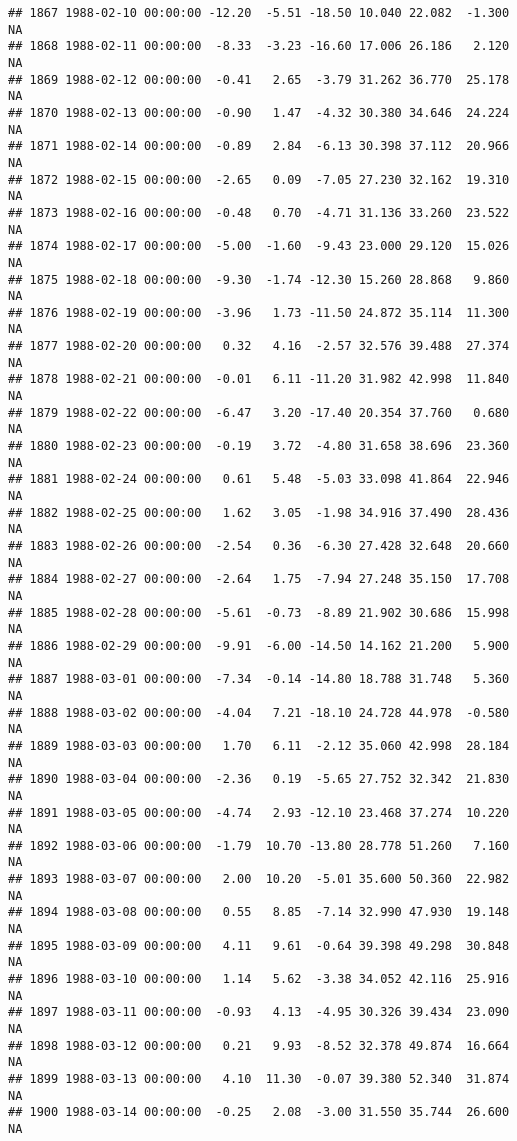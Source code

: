 \documentclass{article}\usepackage{graphicx, color}
\makeatletter
\newenvironment{kframe}{%
 \def\at@end@of@kframe{}%
 \ifinner\ifhmode%
  \def\at@end@of@kframe{\end{minipage}}%
  \begin{minipage}{\columnwidth}%
 \fi\fi%
 \def\FrameCommand##1{\hskip\@totalleftmargin \hskip-\fboxsep
 \colorbox{shadecolor}{##1}\hskip-\fboxsep
     \hskip-\linewidth \hskip-\@totalleftmargin \hskip\columnwidth}%
 \MakeFramed {\advance\hsize-\width
   \@totalleftmargin\z@ \linewidth\hsize
   \@setminipage}}%
 {\par\unskip\endMakeFramed%
 \at@end@of@kframe}
\newenvironment{knitrout}{}{} %
\makeatother
\begin{document}
\begin{knitrout}
\begin{kframe}
\begin{verbatim}
## 1867 1988-02-10 00:00:00 -12.20  -5.51 -18.50 10.040 22.082  -1.300     NA
## 1868 1988-02-11 00:00:00  -8.33  -3.23 -16.60 17.006 26.186   2.120     NA
## 1869 1988-02-12 00:00:00  -0.41   2.65  -3.79 31.262 36.770  25.178     NA
## 1870 1988-02-13 00:00:00  -0.90   1.47  -4.32 30.380 34.646  24.224     NA
## 1871 1988-02-14 00:00:00  -0.89   2.84  -6.13 30.398 37.112  20.966     NA
## 1872 1988-02-15 00:00:00  -2.65   0.09  -7.05 27.230 32.162  19.310     NA
## 1873 1988-02-16 00:00:00  -0.48   0.70  -4.71 31.136 33.260  23.522     NA
## 1874 1988-02-17 00:00:00  -5.00  -1.60  -9.43 23.000 29.120  15.026     NA
## 1875 1988-02-18 00:00:00  -9.30  -1.74 -12.30 15.260 28.868   9.860     NA
## 1876 1988-02-19 00:00:00  -3.96   1.73 -11.50 24.872 35.114  11.300     NA
## 1877 1988-02-20 00:00:00   0.32   4.16  -2.57 32.576 39.488  27.374     NA
## 1878 1988-02-21 00:00:00  -0.01   6.11 -11.20 31.982 42.998  11.840     NA
## 1879 1988-02-22 00:00:00  -6.47   3.20 -17.40 20.354 37.760   0.680     NA
## 1880 1988-02-23 00:00:00  -0.19   3.72  -4.80 31.658 38.696  23.360     NA
## 1881 1988-02-24 00:00:00   0.61   5.48  -5.03 33.098 41.864  22.946     NA
## 1882 1988-02-25 00:00:00   1.62   3.05  -1.98 34.916 37.490  28.436     NA
## 1883 1988-02-26 00:00:00  -2.54   0.36  -6.30 27.428 32.648  20.660     NA
## 1884 1988-02-27 00:00:00  -2.64   1.75  -7.94 27.248 35.150  17.708     NA
## 1885 1988-02-28 00:00:00  -5.61  -0.73  -8.89 21.902 30.686  15.998     NA
## 1886 1988-02-29 00:00:00  -9.91  -6.00 -14.50 14.162 21.200   5.900     NA
## 1887 1988-03-01 00:00:00  -7.34  -0.14 -14.80 18.788 31.748   5.360     NA
## 1888 1988-03-02 00:00:00  -4.04   7.21 -18.10 24.728 44.978  -0.580     NA
## 1889 1988-03-03 00:00:00   1.70   6.11  -2.12 35.060 42.998  28.184     NA
## 1890 1988-03-04 00:00:00  -2.36   0.19  -5.65 27.752 32.342  21.830     NA
## 1891 1988-03-05 00:00:00  -4.74   2.93 -12.10 23.468 37.274  10.220     NA
## 1892 1988-03-06 00:00:00  -1.79  10.70 -13.80 28.778 51.260   7.160     NA
## 1893 1988-03-07 00:00:00   2.00  10.20  -5.01 35.600 50.360  22.982     NA
## 1894 1988-03-08 00:00:00   0.55   8.85  -7.14 32.990 47.930  19.148     NA
## 1895 1988-03-09 00:00:00   4.11   9.61  -0.64 39.398 49.298  30.848     NA
## 1896 1988-03-10 00:00:00   1.14   5.62  -3.38 34.052 42.116  25.916     NA
## 1897 1988-03-11 00:00:00  -0.93   4.13  -4.95 30.326 39.434  23.090     NA
## 1898 1988-03-12 00:00:00   0.21   9.93  -8.52 32.378 49.874  16.664     NA
## 1899 1988-03-13 00:00:00   4.10  11.30  -0.07 39.380 52.340  31.874     NA
## 1900 1988-03-14 00:00:00  -0.25   2.08  -3.00 31.550 35.744  26.600     NA

\end{verbatim}
\end{kframe}
\end{knitrout}
\end{document}

